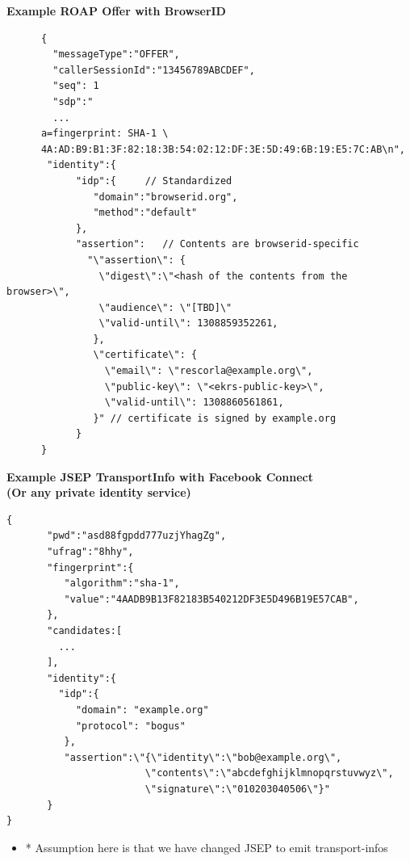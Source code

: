 \documentclass[helvetica]{seminar}
\newcommand{\heading}[1]{%
  \begin{center} 
    \large\bf 
    #1 
  \end{center} 
  \vspace{.4 in}}
\begin{document}
\begin{slide}
\heading{Example ROAP Offer with BrowserID}

\begin{tiny}
\begin{verbatim}
      {
        "messageType":"OFFER",
        "callerSessionId":"13456789ABCDEF",
        "seq": 1
        "sdp":"
        ...
      a=fingerprint: SHA-1 \
      4A:AD:B9:B1:3F:82:18:3B:54:02:12:DF:3E:5D:49:6B:19:E5:7C:AB\n",
       "identity":{
            "idp":{     // Standardized
               "domain":"browserid.org",
               "method":"default"
            },
            "assertion":   // Contents are browserid-specific
              "\"assertion\": {
                \"digest\":\"<hash of the contents from the browser>\",
                \"audience\": \"[TBD]\"
                \"valid-until\": 1308859352261,
               },
               \"certificate\": {
                 \"email\": \"rescorla@example.org\",
                 \"public-key\": \"<ekrs-public-key>\",
                 \"valid-until\": 1308860561861,
               }" // certificate is signed by example.org
            }
      }
\end{verbatim}
\end{tiny}
\end{slide}



\begin{slide}
\heading{Example JSEP TransportInfo with Facebook Connect\\(Or any private identity service)}

\vspace{-.3in}
\begin{tiny}
\begin{verbatim}
{
       "pwd":"asd88fgpdd777uzjYhagZg",
       "ufrag":"8hhy",
       "fingerprint":{
          "algorithm":"sha-1",
          "value":"4AADB9B13F82183B540212DF3E5D496B19E57CAB",
       },
       "candidates:[
         ...
       ],
       "identity":{
         "idp":{
            "domain": "example.org"
            "protocol": "bogus"
          },
          "assertion":\"{\"identity\":\"bob@example.org\",
                        \"contents\":\"abcdefghijklmnopqrstuvwyz\",
                        \"signature\":\"010203040506\"}"
       }
}
\end{verbatim}
\end{tiny}                      

\begin{itemize}
\item[] * Assumption here is that we have changed JSEP to emit transport-infos
\end{itemize}

\end{slide}
\end{document}

